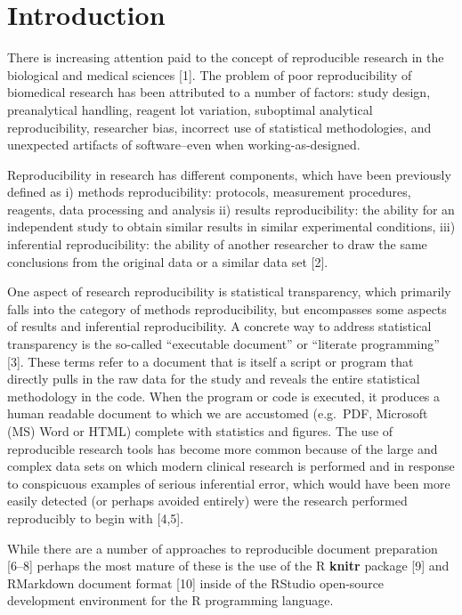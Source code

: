 \documentclass[]{elsarticle} %
\begin{document}
\hypertarget{introduction}{%
\section{Introduction}\label{introduction}}

There is increasing attention paid to the concept of reproducible
research in the biological and medical sciences {[}1{]}. The problem of
poor reproducibility of biomedical research has been attributed to a
number of factors: study design, preanalytical handling, reagent lot
variation, suboptimal analytical reproducibility, researcher bias,
incorrect use of statistical methodologies, and unexpected artifacts of
software--even when working-as-designed.

Reproducibility in research has different components, which have been
previously defined as i) methods reproducibility: protocols, measurement
procedures, reagents, data processing and analysis ii) results
reproducibility: the ability for an independent study to obtain similar
results in similar experimental conditions, iii) inferential
reproducibility: the ability of another researcher to draw the same
conclusions from the original data or a similar data set {[}2{]}.

One aspect of research reproducibility is statistical transparency,
which primarily falls into the category of methods reproducibility, but
encompasses some aspects of results and inferential reproducibility. A
concrete way to address statistical transparency is the so-called
``executable document'' or ``literate programming'' {[}3{]}. These terms
refer to a document that is itself a script or program that directly
pulls in the raw data for the study and reveals the entire statistical
methodology in the code. When the program or code is executed, it
produces a human readable document to which we are accustomed (e.g.~PDF,
Microsoft (MS) Word or HTML) complete with statistics and figures. The
use of reproducible research tools has become more common because of the
large and complex data sets on which modern clinical research is
performed and in response to conspicuous examples of serious inferential
error, which would have been more easily detected (or perhaps avoided
entirely) were the research performed reproducibly to begin with
{[}4,5{]}.

While there are a number of approaches to reproducible document
preparation {[}6--8{]} perhaps the most mature of these is the use of
the R \textbf{knitr} package {[}9{]} and RMarkdown document format
{[}10{]} inside of the RStudio open-source development environment for
the R programming language.
\end{document}
